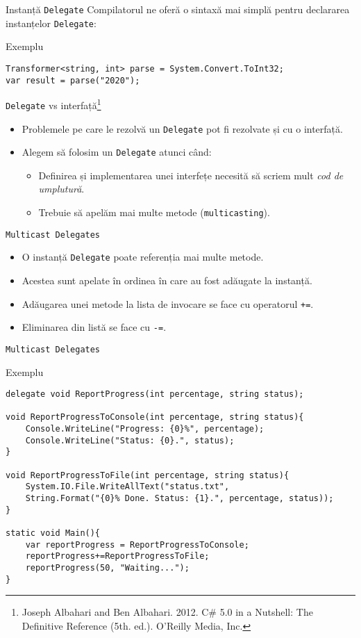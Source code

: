 \documentclass[presentation]{beamer}
\begin{document}
\begin{frame}[label={sec:org8f090f0},fragile]{Instanță \texttt{Delegate}}
 Compilatorul ne oferă o sintaxă mai simplă pentru declararea instanțelor \texttt{Delegate}:
\begin{block}{Exemplu}
\begin{verbatim}
Transformer<string, int> parse = System.Convert.ToInt32;
var result = parse("2020");
\end{verbatim}
\end{block}
\end{frame}
\begin{frame}[label={sec:orga3b65b6},fragile]{\texttt{Delegate} vs interfață\footnote{Joseph Albahari and Ben Albahari. 2012. C\# 5.0 in a Nutshell: The Definitive Reference (5th. ed.). O’Reilly Media, Inc.}}
 \begin{itemize}
\item Problemele pe care le rezolvă un \texttt{Delegate} pot fi rezolvate și cu o interfață.
\item Alegem să folosim un \texttt{Delegate} atunci când:
\begin{itemize}
\item Definirea și implementarea unei interfețe necesită să scriem mult \emph{cod de umplutură}.
\item Trebuie să apelăm mai multe metode (\texttt{multicasting}).
\end{itemize}
\end{itemize}
\end{frame}
\begin{frame}[label={sec:org7153ac6},fragile]{\texttt{Multicast Delegates}}
 \begin{itemize}
\item O instanță \texttt{Delegate} poate referenția mai multe metode.
\item Acestea sunt apelate în ordinea în care au fost adăugate la instanță.
\item Adăugarea unei metode la lista de invocare se face cu operatorul \texttt{+=}.
\item Eliminarea din listă se face cu \texttt{-=}.
\end{itemize}
\end{frame}
\begin{frame}[label={sec:org63b61c0},fragile]{\texttt{Multicast Delegates}}
 \begin{block}{Exemplu}
\begin{verbatim}
delegate void ReportProgress(int percentage, string status);

void ReportProgressToConsole(int percentage, string status){
    Console.WriteLine("Progress: {0}%", percentage);
    Console.WriteLine("Status: {0}.", status);
}

void ReportProgressToFile(int percentage, string status){
    System.IO.File.WriteAllText("status.txt",
	String.Format("{0}% Done. Status: {1}.", percentage, status));
}

static void Main(){
    var reportProgress = ReportProgressToConsole;
    reportProgress+=ReportProgressToFile;
    reportProgress(50, "Waiting...");
}
\end{verbatim}
\end{block}
\end{frame}
\end{document}
